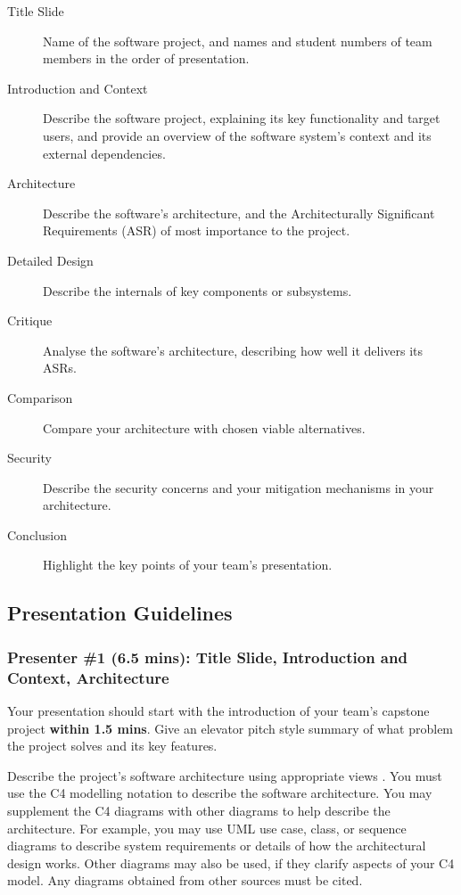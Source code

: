 \documentclass{csse4400}
\begin{document}
\begin{description}
    \item[Title Slide] Name of the software project, and names and student numbers of team members in the order of presentation.
    \item[Introduction and Context] Describe the software project, explaining its key functionality and target users, and provide an overview of the software system's context and its external dependencies.
    \item[Architecture] Describe the software's architecture, and the Architecturally Significant Requirements (ASR) of most importance to the project.
    \item[Detailed Design] Describe the internals of key components or subsystems.
    \item[Critique] Analyse the software's architecture, describing how well it delivers its ASRs.
    \item[Comparison] Compare your architecture with chosen viable alternatives.
    \item[Security] Describe the security concerns and your mitigation mechanisms in your architecture.
    \item[Conclusion] Highlight the key points of your team's presentation.
\end{description}



\subsection{Presentation Guidelines}


\subsubsection{Presenter \#1 (6.5 mins): Title Slide, Introduction and Context, Architecture}

Your presentation should start with the introduction of your team's capstone project \textbf{within 1.5 mins}.
Give an elevator pitch style summary of what problem the project solves and its key features.


Describe the project's software architecture using appropriate views \cite{view-notes}.
You must use the C4 modelling notation \cite{view-notes} \cite{brown2022c4} to describe the software architecture.
You may supplement the C4 diagrams with other diagrams to help describe the architecture.
For example, you may use UML use case, class, or sequence diagrams \cite{view-notes} \cite{uml}
to describe system requirements or details of how the architectural design works.
Other diagrams may also be used, if they clarify aspects of your C4 model.
Any diagrams obtained from other sources  must be cited.
\end{document}
